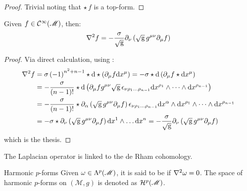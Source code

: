 \begin{proofbox}
  \begin{proof}
    Trivial noting that $ \star\, f $ is a top-form.
  \end{proof}
\end{proofbox}

\begin{proposition}{}{}
  Given $ f \in \mathcal{C}^{\infty}(\mathscr{M}) $, then:
  \begin{equation}
    \nabla^2 f = - \frac{\sigma}{\sqrt{\mathrm{g}}} \partial_{\nu} \left( \sqrt{\mathrm{g}}\, g^{\mu \nu} \partial_{\mu} f \right)
  \end{equation}
\end{proposition}

\begin{proofbox}
  \begin{proof}
    Via direct calculation, using :
    \begin{equation*}
      \begin{split}
        \nabla^2 f
        &= \sigma \left( -1 \right)^{n^2 + n - 1} \star \mathrm{d} \star \left( \partial_{\mu} f \mathrm{d} x^{\mu} \right) = - \sigma \star \mathrm{d} \left( \partial_{\mu} f \star \mathrm{d} x^{\mu} \right) \\
        &= - \frac{\sigma}{(n-1)!} \star \mathrm{d} \left( \partial_{\mu} f g^{\mu \nu} \sqrt{\mathrm{g}}\, \epsilon_{\nu \rho_1 \dots \rho_{n-1}} \mathrm{d} x^{\rho_1} \wedge \dots \wedge \mathrm{d} x^{\rho_{n-1}} \right) \\
        &= - \frac{\sigma}{(n-1)!} \star \partial_{\alpha} \left( \sqrt{\mathrm{g}}\, g^{\mu \nu} \partial_{\mu} f \right) \epsilon_{\nu \rho_1 \dots \rho_{n-1}} \mathrm{d} x^{\alpha} \wedge \mathrm{d} x^{\rho_1} \wedge \dots \wedge \mathrm{d} x^{\rho_{n-1}} \\
        &= - \sigma \star \partial_{\nu} \left( \sqrt{\mathrm{g}}\, g^{\mu \nu} \partial_{\mu} f \right) \mathrm{d} x^1 \wedge \dots \mathrm{d} x^n = - \frac{\sigma}{\sqrt{\mathrm{g}}} \partial_{\nu} \left( \sqrt{\mathrm{g}}\, g^{\mu \nu} \partial_{\mu} f \right)
      \end{split}
    \end{equation*}
    which is the thesis.
  \end{proof}
\end{proofbox}

The Laplacian operator is linked to the de Rham cohomology.

\begin{definition}{Harmonic $ p $-forms}{}
  Given $ \omega \in \Lambda^{p}(\mathscr{M}) $, it is said to be  if $ \nabla^2 \omega = 0 $.
  The space of harmonic $ p $-forms on $ (\mathcal{M},g) $ is denoted as $ \mathcal{H}^{p}(\mathscr{M}) $.
\end{definition}

